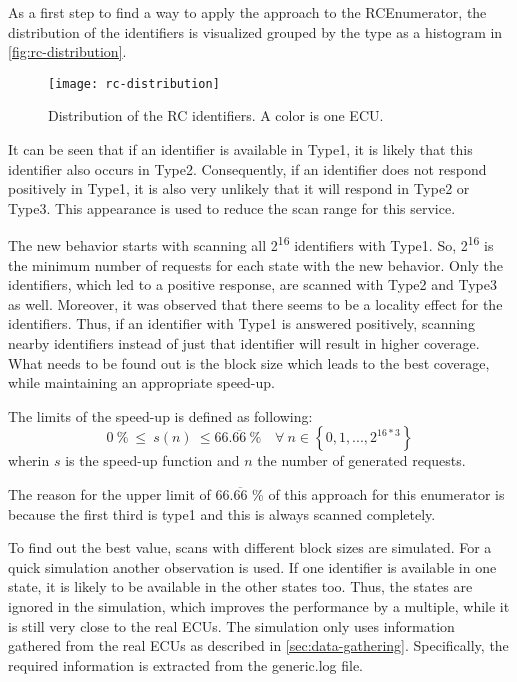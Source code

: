 As a first step to find a way to apply the approach to the RCEnumerator, the distribution of the identifiers is visualized grouped by the type as a histogram in \autoref{fig:rc-distribution}.

\begin{figure}[h]
    \centering
    \texttt{[image: rc-distribution]}
    \caption{Distribution of the RC identifiers. A color is one ECU.}
    \label{fig:rc-distribution}
\end{figure}

It can be seen that if an identifier is available in Type1, it is likely that this identifier also occurs in Type2. Consequently, if an identifier does not respond positively in Type1, it is also very unlikely that it will respond in Type2 or Type3. This appearance is used to reduce the scan range for this service.

The new behavior starts with scanning all 2\textsuperscript{16} identifiers with Type1. So, 2\textsuperscript{16} is the minimum number of requests for each state with the new behavior. Only the identifiers, which led to a positive response, are scanned with Type2 and Type3 as well. Moreover, it was observed that there seems to be a locality effect for the identifiers. Thus, if an identifier with Type1 is answered positively, scanning nearby identifiers instead of just that identifier will result in higher coverage. What needs to be found out is the block size which leads to the best coverage, while maintaining an appropriate speed-up.

The limits of the speed-up is defined as following:
\[ 0\ \% \ \leq\  s(n)\  \leq 66.\overline{66}\ \% \quad \forall \  n \in \left\{0, 1, ..., 2^{16 * 3}\right\} \]
wherin $s$ is the speed-up function and $n$ the number of generated requests.

The reason for the upper limit of $66.\overline{66}$ \% of this approach for this enumerator is because the first third is type1 and this is always scanned completely.

To find out the best value, scans with different block sizes are simulated. For a quick simulation another observation is used. If one identifier is available in one state, it is likely to be available in the other states too. Thus, the states are ignored in the simulation, which improves the performance by a multiple, while it is still very close to the real ECUs. The simulation only uses information gathered from the real ECUs as described in \autoref{sec:data-gathering}. Specifically, the required information is extracted from the generic.log file.

